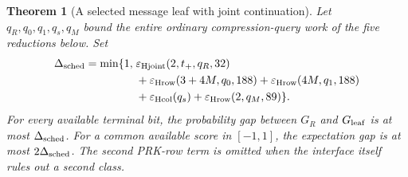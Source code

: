 \documentclass[pdflatex]{sn-jnl}
\theoremstyle{thmstyleone}
\newtheorem{theorem}{Theorem}[section]
\theoremstyle{thmstylethree}
\theoremstyle{thmstyletwo}
\begin{document}
\begin{theorem}[A selected message leaf with joint continuation]
\label{thm:joint-message-leaf}
Let $q_R,q_0,q_1,q_s,q_M$ bound the entire ordinary compression-query work
of the five reductions below. Set
\begin{equation}
\begin{split}
 \Delta_{\rm sched}=\min\{1,\;&
 \varepsilon_{\rm Hjoint}(2,t_+,q_R,32)\\
 &+\varepsilon_{\rm Hrow}(3+4M,q_0,188)
  +\varepsilon_{\rm Hrow}(4M,q_1,188)\\
 &+\varepsilon_{\rm Hcol}(q_s)
  +\varepsilon_{\rm Hrow}(2,q_M,89)\}.
\end{split}
 \label{eq:joint-schedule-error}
\end{equation}
For every available terminal bit, the probability gap between $G_R$ and
$G_{\rm leaf}$ is at most $\Delta_{\rm sched}$.
For a common available score in $[-1,1]$, the expectation gap is at most
$2\Delta_{\rm sched}$. The second PRK-row term is omitted when the interface
itself rules out a second class.
\end{theorem}
\end{document}
